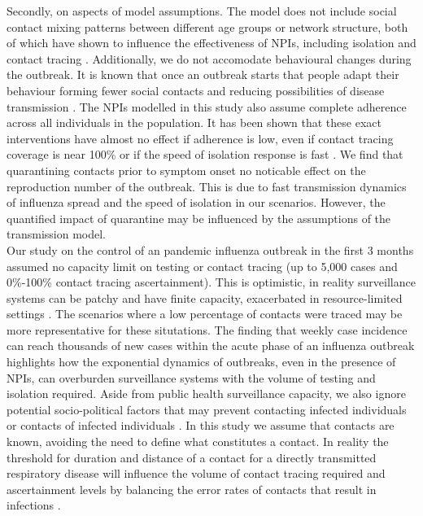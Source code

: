 \documentclass{article}
\begin{document}
Secondly, on aspects of model assumptions. The model does not include social contact mixing patterns between different age groups or network structure, both of which have shown to influence the effectiveness of NPIs, including isolation and contact tracing \citep{brooks-pollockMappingSocialDistancing2021, avkanQuantifyingH5N1Outbreak2025}. Additionally, we do not accomodate behavioural changes during the outbreak. It is known that once an outbreak starts that people adapt their behaviour forming fewer social contacts and reducing possibilities of disease transmission \citep{vankerckhoveImpactIllnessSocial2013}. The NPIs modelled in this study also assume complete adherence across all individuals in the population. It has been shown that these exact interventions have almost no effect if adherence is low, even if contact tracing coverage is near 100\% or if the speed of isolation response is fast \citep{davisContactTracingImperfect2021}. We find that quarantining contacts prior to symptom onset no noticable effect on the reproduction number of the outbreak. This is due to fast transmission dynamics of influenza spread and the speed of isolation in our scenarios. However, the quantified impact of quarantine may be influenced by the assumptions of the transmission model. \\

Our study on the control of an pandemic influenza outbreak in the first 3 months assumed no capacity limit on testing or contact tracing (up to 5,000 cases and 0\%-100\% contact tracing ascertainment). This is optimistic, in reality surveillance systems can be patchy and have finite capacity, exacerbated in resource-limited settings \citep{dhillonWhenContactTracing2018}. The scenarios where a low percentage of contacts were traced may be more representative for these situtations. The finding that weekly case incidence can reach thousands of new cases within the acute phase of an influenza outbreak highlights how the exponential dynamics of outbreaks, even in the presence of NPIs, can overburden surveillance systems with the volume of testing and isolation required. Aside from public health surveillance capacity, we also ignore potential socio-political factors that may prevent contacting infected individuals or contacts of infected individuals \citep{dhillonWhenContactTracing2018}. In this study we assume that contacts are known, avoiding the need to define what constitutes a contact. In reality the threshold for duration and distance of a contact for a directly transmitted respiratory disease will influence the volume of contact tracing required and ascertainment levels by balancing the error rates of contacts that result in infections \citep{keelingEfficacyContactTracing2020, ferrettiDigitalMeasurementSARSCoV22024}. \\
\end{document}
